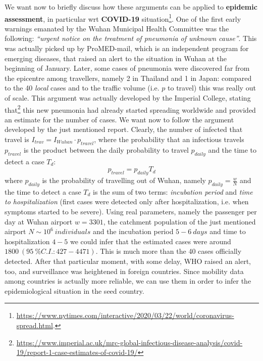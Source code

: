\documentclass[../main/main.tex]{subfiles}
\begin{document}
We want now to briefly discuss how these arguments can be applied to \textbf{epidemic assessment}, in particular wrt \textbf{COVID-19} situation\footnote{\url{https://www.nytimes.com/interactive/2020/03/22/world/coronavirus-spread.html}.}. One of the first early warnings emanated by the Wuhan Municipal Health Committee was the following: \emph{“urgent notice on the treatment of pneumonia of unknown cause”}. This was actually picked up by ProMED-mail, which is an independent program for emerging diseases, that raised an alert to the situation in Wuhan at the beginning of January. Later, some cases of pneumonia were discovered far from the epicentre among travellers, namely 2 in Thailand and 1 in Japan: compared to the 40 \textit{local} cases and to the traffic volume (i.e. $p$ to travel) this was really out of scale. This argument was actually developed by the Imperial College, stating that\footnote{\url{https://www.imperial.ac.uk/mrc-global-infectious-disease-analysis/covid-19/report-1-case-estimates-of-covid-19/}} this new pneumonia had already started spreading worldwide and provided an estimate for the number of cases. We want now to follow the argument developed by the just mentioned report. Clearly, the number of infected that travel is $I_{trav} = I_{Wuhan}\cdot p_{travel}$, where the probability that an infectious travels $p_{travel}$ is the product between the daily probability to travel $p_{daily}$ and the time to detect a case $T_d$:
\begin{equation}
    p_{travel} = p_{daily} T_d
\end{equation}
where $p_{daily}$ is the probability of travelling out of Wuhan, namely $p_{daily} = \frac{w}{N}$ and the time to detect a case $T_d$ is the sum of two terms: \textit{incubation period} and \textit{time to hospitalization} (first cases were detected only after hospitalization, i.e. when symptoms started to be severe).
Using real parameters, namely the passenger per day at Wuhan airport $w = 3301$, the catchment population of the just mentioned airport $N\sim 10^6\ individuals$ and the incubation period $5-6\ days$ and time to hospitalization $4-5$ we could infer that the estimated cases were around $1800\ (95\ \% C.I. : 427 - 4471)$. This is much more than the 40 cases officially detected. After that particular moment, with some delay, WHO raised an alert, too, and surveillance was heightened in foreign countries. Since mobility data among countries is actually more reliable, we can use them in order to infer the epidemiological situation in the seed country.
\end{document}
